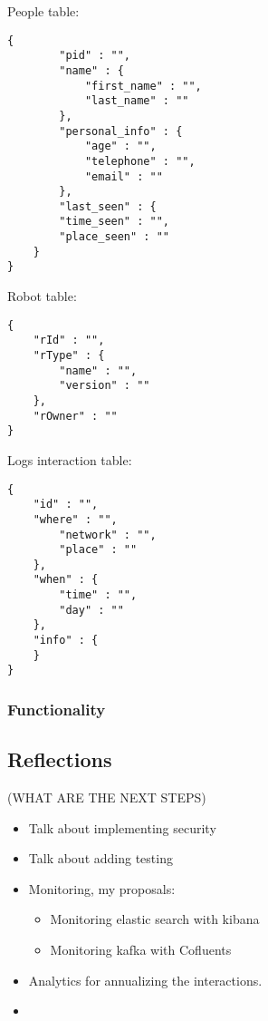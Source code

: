 \documentclass[]{article}
\providecommand{\tightlist}{%
  \setlength{\itemsep}{0pt}\setlength{\parskip}{0pt}}
\begin{document}
People table:

\begin{verbatim}
{ 
        "pid" : "",       
        "name" : { 
            "first_name" : "", 
            "last_name" : "" 
        }, 
        "personal_info" : { 
            "age" : "", 
            "telephone" : "", 
            "email" : "" 
        }, 
        "last_seen" : { 
        "time_seen" : "", 
        "place_seen" : "" 
    } 
} 
\end{verbatim}

Robot table:

\begin{verbatim}
{ 
    "rId" : "", 
    "rType" : { 
        "name" : "", 
        "version" : "" 
    }, 
    "rOwner" : "" 
} 
\end{verbatim}

Logs interaction table:

\begin{verbatim}
{ 
    "id" : "", 
    "where" : "", 
        "network" : "", 
        "place" : "" 
    }, 
    "when" : { 
        "time" : "", 
        "day" : "" 
    }, 
    "info" : { 
    } 
} 
\end{verbatim}

\hypertarget{functionality}{%
\subsubsection{Functionality}\label{functionality}}

\hypertarget{reflections}{%
\subsection{Reflections}\label{reflections}}

(WHAT ARE THE NEXT STEPS)

\begin{itemize}
\item
  Talk about implementing security
\item
  Talk about adding testing
\item
  Monitoring, my proposals:

  \begin{itemize}
  \tightlist
  \item
    Monitoring elastic search with kibana
  \item
    Monitoring kafka with Cofluents
  \end{itemize}
\item
  Analytics for annualizing the interactions.
\item
\end{itemize}
\end{document}

